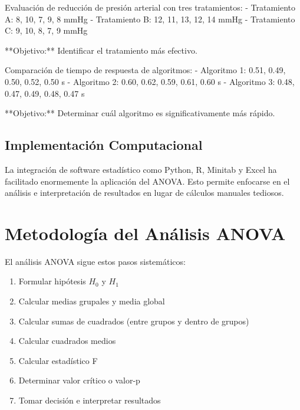 \begin{example}[Medicina]
Evaluación de reducción de presión arterial con tres tratamientos:
- Tratamiento A: 8, 10, 7, 9, 8 mmHg
- Tratamiento B: 12, 11, 13, 12, 14 mmHg
- Tratamiento C: 9, 10, 8, 7, 9 mmHg

**Objetivo:** Identificar el tratamiento más efectivo.
\end{example}

\begin{example}
Comparación de tiempo de respuesta de algoritmos:
- Algoritmo 1: 0.51, 0.49, 0.50, 0.52, 0.50 s
- Algoritmo 2: 0.60, 0.62, 0.59, 0.61, 0.60 s
- Algoritmo 3: 0.48, 0.47, 0.49, 0.48, 0.47 s

**Objetivo:** Determinar cuál algoritmo es significativamente más rápido.
\end{example}

\subsection{Implementación Computacional}

\begin{remark}
La integración de software estadístico como Python, R, Minitab y Excel ha facilitado enormemente la aplicación del ANOVA. Esto permite enfocarse en el análisis e interpretación de resultados en lugar de cálculos manuales tediosos.
\end{remark}

 
\section{Metodología del Análisis ANOVA}

\begin{theorem}
El análisis ANOVA sigue estos pasos sistemáticos:
\begin{enumerate}
    \item Formular hipótesis $H_0$ y $H_1$
    \item Calcular medias grupales y media global
    \item Calcular sumas de cuadrados (entre grupos y dentro de grupos)
    \item Calcular cuadrados medios
    \item Calcular estadístico F
    \item Determinar valor crítico o valor-p
    \item Tomar decisión e interpretar resultados
\end{enumerate}
\end{theorem}


